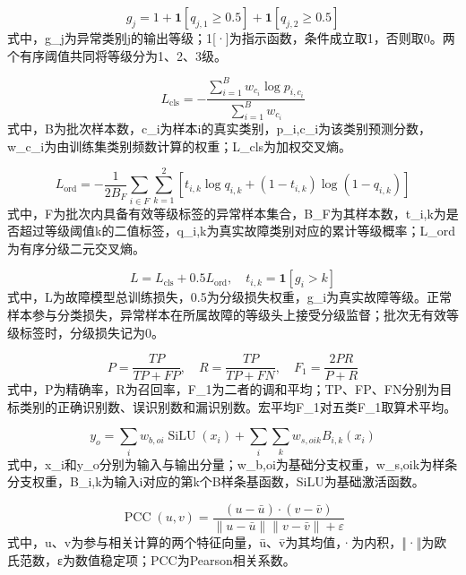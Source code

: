 \documentclass[UTF8]{ctexart}
\begin{document}
\begin{equation}
g_j=1+\mathbf{1}[q_{j,1}\ge0.5]+\mathbf{1}[q_{j,2}\ge0.5]
\tag{8}
\end{equation}
式中，g\_j为异常类别j的输出等级；1[·]为指示函数，条件成立取1，否则取0。两个有序阈值共同将等级分为1、2、3级。

\begin{equation}
L_{\mathrm{cls}}=-\frac{\sum_{i=1}^{B}w_{c_i}\log p_{i,c_i}}{\sum_{i=1}^{B}w_{c_i}}
\tag{9}
\end{equation}
式中，B为批次样本数，c\_i为样本i的真实类别，p\_i,c\_i为该类别预测分数，w\_c\_i为由训练集类别频数计算的权重；L\_cls为加权交叉熵。

\begin{equation}
L_{\mathrm{ord}}=-\frac{1}{2B_F}\sum_{i\in F}\sum_{k=1}^{2}\left[t_{i,k}\log q_{i,k}+(1-t_{i,k})\log(1-q_{i,k})\right]
\tag{10}
\end{equation}
式中，F为批次内具备有效等级标签的异常样本集合，B\_F为其样本数，t\_i,k为是否超过等级阈值k的二值标签，q\_i,k为真实故障类别对应的累计等级概率；L\_ord为有序分级二元交叉熵。

\begin{equation}
L=L_{\mathrm{cls}}+0.5L_{\mathrm{ord}},\quad t_{i,k}=\mathbf{1}[g_i>k]
\tag{11}
\end{equation}
式中，L为故障模型总训练损失，0.5为分级损失权重，g\_i为真实故障等级。正常样本参与分类损失，异常样本在所属故障的等级头上接受分级监督；批次无有效等级标签时，分级损失记为0。

\begin{equation}
P=\frac{TP}{TP+FP},\quad R=\frac{TP}{TP+FN},\quad F_1=\frac{2PR}{P+R}
\tag{12}
\end{equation}
式中，P为精确率，R为召回率，F\_1为二者的调和平均；TP、FP、FN分别为目标类别的正确识别数、误识别数和漏识别数。宏平均F\_1对五类F\_1取算术平均。

\begin{equation}
y_o=\sum_i w_{b,oi}\operatorname{SiLU}(x_i)+\sum_i\sum_k w_{s,oik}B_{i,k}(x_i)
\tag{13}
\end{equation}
式中，x\_i和y\_o分别为输入与输出分量；w\_b,oi为基础分支权重，w\_s,oik为样条分支权重，B\_i,k为输入i对应的第k个B样条基函数，SiLU为基础激活函数。

\begin{equation}
\operatorname{PCC}(u,v)=\frac{(u-\bar u)\cdot(v-\bar v)}{\|u-\bar u\|\|v-\bar v\|+\varepsilon}
\tag{14}
\end{equation}
式中，u、v为参与相关计算的两个特征向量，ū、v̄为其均值，·为内积，‖·‖为欧氏范数，ε为数值稳定项；PCC为Pearson相关系数。
\end{document}
